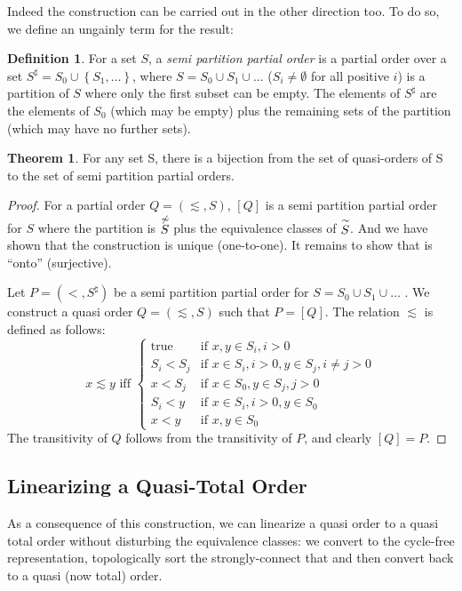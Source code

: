 \documentclass[12pt]{article}
\theoremstyle{definition}
\newtheorem{definition}{Definition}[section]
\theoremstyle{theorem}
\newtheorem{theorem}{Theorem}[section]
\def\aset#1{\left\{{#1}\right\}}
\begin{document}
Indeed the construction can be carried out in the other direction too.
To do so, we define an ungainly term for the result:
\begin{definition}
  For a set $S$, a \emph{semi partition partial order} is a partial
  order over a set \(S^{\sharp} = S_0 \cup \aset{S_1,\ldots}\), where  \(S =
  S_0 \cup S_1 \cup \ldots \) ($S_i\neq \emptyset$ for all
  positive $i$) is a partition of $S$ where only the first subset can
  be empty. The elements of
  \(S^{\sharp}\) are the elements of $S_0$ (which may be empty) plus
  the remaining sets of the partition (which may have no further sets).
\end{definition}
\begin{theorem}
  For any set S, there is a bijection from the set of quasi-orders of
  S to the set of semi partition partial orders.
\end{theorem}
\begin{proof}
  For a partial order $Q=(\lesssim,S)$, $[Q]$ is a semi partition
  partial order for $S$ where the partition is $\stackrel{\not\sim}{S}$ plus
  the equivalence classes of $\stackrel{\sim}{S}$. And we have shown that the
  construction is unique (one-to-one).  It remains to show that is
  ``onto'' (surjective).

  Let $P=(<,S^{\sharp})$ be a semi partition partial order for
  $S = S_0 \cup S_1 \cup \ldots$ .  We
  construct a quasi order $Q=(\lesssim,S)$ such that $P = [Q]$.
  The relation $\lesssim$ is defined as follows:
  \[
  x \lesssim y \textrm{ iff }
  \left\{
  \begin{array}{cl}
    \textrm{true}& \textrm{if } x,y \in S_i, i > 0 \\
    S_i < S_j & \textrm{if } x \in S_i, i > 0, y \in S_j, i \neq j > 0 \\
    x < S_j   & \textrm{if } x \in S_0, y \in S_j, j > 0 \\     
    S_i < y   & \textrm{if } x \in S_i, i > 0, y \in S_0 \\
    x < y     & \textrm{if } x, y \in S_0
  \end{array}\right.
  \]
  The transitivity of $Q$ follows from the transitivity of $P$, and
  clearly $[Q] = P$.
\end{proof}

\subsection{Linearizing a Quasi-Total Order}

As a consequence of this construction, we can linearize a quasi order
to a quasi total order without disturbing the equivalence classes: we
convert to the cycle-free representation, topologically sort the strongly-connect that and
then convert back to a quasi (now total) order.
\end{document}
